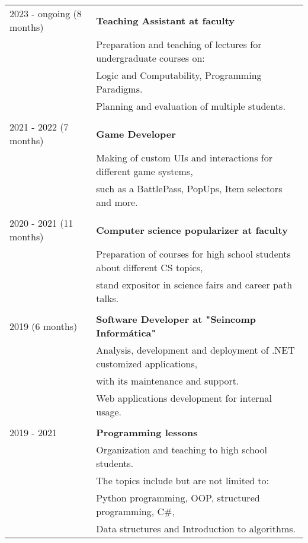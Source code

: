\documentclass{article}
\begin{document}
\begin{tabular}{l | l}
    2023 - ongoing (8 months) & \textbf{Teaching Assistant at faculty} \\
                            & Preparation and teaching of lectures for undergraduate courses on: \\
                            & Logic and Computability, Programming Paradigms. \\ 
                            & Planning and evaluation of multiple students. \\
                            \\
    2021 - 2022 (7 months) & \textbf{Game Developer} \\
                            & Making of custom UIs and interactions for different game systems, \\
                            & such as a BattlePass, PopUps, Item selectors and more. \\
                            \\
    2020 - 2021 (11 months) & \textbf{Computer science popularizer at faculty} \\
                            & Preparation of courses for high school students about different CS topics, \\ 
                            & stand expositor in science fairs and career path talks. \\
                            \\
    2019 (6 months) & \textbf{Software Developer at "Seincomp Informática"} \\
                    &  Analysis, development and deployment of .NET customized applications, \\ 
                    & with its maintenance and support. \\
                    & Web applications development for internal usage.\\
                    \\
    2019 - 2021     & \textbf{Programming lessons}  \\
                    & Organization and teaching to high school students. \\
                    & The topics include but are not limited to: \\ 
                    & Python programming, OOP, structured programming, C\#, \\ 
                    & Data structures and Introduction to algorithms.
\end{tabular}
\end{document}
